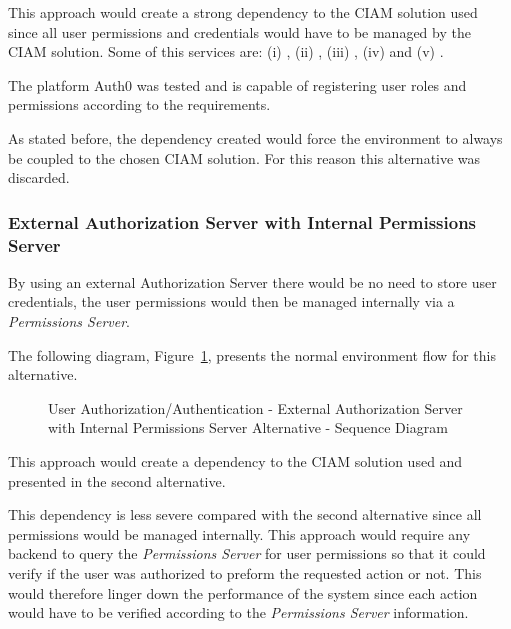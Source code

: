 This approach would create a strong dependency to the \gls{CIAM} solution used since all user permissions and credentials would have to be managed by the \gls{CIAM} solution.
Some of this services are: (i) , (ii) , (iii) , (iv)  and (v) .

The platform Auth0 was tested and is capable of registering user roles and permissions according to the requirements.

As stated before, the dependency created would force the environment to always be coupled to the chosen \gls{CIAM} solution. For this reason this alternative was discarded.

\subsubsection{External Authorization Server with Internal Permissions Server}
\label{subsubsec:design:alternatives:auth:externalauthinternalpermission}

By using an external Authorization Server there would be no need to store user credentials, the user permissions would then be managed internally via a \textit{Permissions Server}.

The following diagram, Figure~\ref{fig:design:alternatives:auth:externalauthinternalpermission:diagram}, presents the normal environment flow for this alternative.

\begin{figure}[H]
   \centering
   \resizebox{\columnwidth}{!}
   {
      
   }
   \caption[User Authorization/Authentication - External Authorization Server with Internal Permissions Server Alternative - Sequence Diagram]{User Authorization/Authentication - External Authorization Server with Internal Permissions Server Alternative - Sequence Diagram}
   \label{fig:design:alternatives:auth:externalauthinternalpermission:diagram}
\end{figure}

This approach would create a dependency to the \gls{CIAM} solution used and presented in the second alternative.

This dependency is less severe compared with the second alternative since all permissions would be managed internally.
This approach would require any backend to query the \textit{Permissions Server} for user permissions so that it could verify if the user was authorized to preform the requested action or not. This would therefore linger down the performance of the system since each action would have to be verified according to the \textit{Permissions Server} information.

